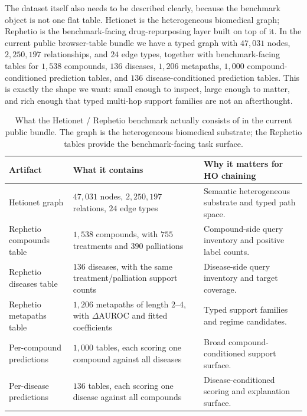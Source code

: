 \documentclass[11pt,openany]{report}
\begin{document}
The dataset itself also needs to be described clearly, because the
benchmark object is not one flat table.  Hetionet is the heterogeneous
biomedical graph; Rephetio is the benchmark-facing drug-repurposing
layer built on top of it.  In the current public browser-table bundle we
have a typed graph with $47{,}031$ nodes, $2{,}250{,}197$ relationships,
and $24$ edge types, together with benchmark-facing tables for $1{,}538$
compounds, $136$ diseases, $1{,}206$ metapaths, $1{,}000$
compound-conditioned prediction tables, and $136$
disease-conditioned prediction tables.\cite{Himmelstein2017Rephetio,DhimmelHetioRepData}
This is exactly the shape we want: small enough to inspect, large enough
to matter, and rich enough that typed multi-hop support families are not
an afterthought.

\begin{table}[ht]
\centering
\scriptsize
\renewcommand{\arraystretch}{1.02}
\begin{tabular}{@{}p{}p{}p{}@{}}
\toprule
Artifact & What it contains & Why it matters for HO chaining \\
\midrule
Hetionet graph &
$47{,}031$ nodes, $2{,}250{,}197$ relations, $24$ edge types &
Semantic heterogeneous substrate and typed path space. \\
Rephetio compounds table &
$1{,}538$ compounds, with $755$ treatments and $390$ palliations &
Compound-side query inventory and positive label counts. \\
Rephetio diseases table &
$136$ diseases, with the same treatment/palliation support counts &
Disease-side query inventory and target coverage. \\
Rephetio metapaths table &
$1{,}206$ metapaths of length $2$--$4$, with $\Delta$AUROC and fitted coefficients &
Typed support families and regime candidates. \\
Per-compound predictions &
$1{,}000$ tables, each scoring one compound against all diseases &
Broad compound-conditioned support surface. \\
Per-disease predictions &
$136$ tables, each scoring one disease against all compounds &
Disease-conditioned scoring and explanation surface. \\
\bottomrule
\end{tabular}
\renewcommand{\arraystretch}{1}
\caption{What the Hetionet / Rephetio benchmark actually consists of in the current public bundle.  The graph is the heterogeneous biomedical substrate; the Rephetio tables provide the benchmark-facing task surface.}
\label{tab:hetionet-dataset-surface}
\end{table}
\end{document}
